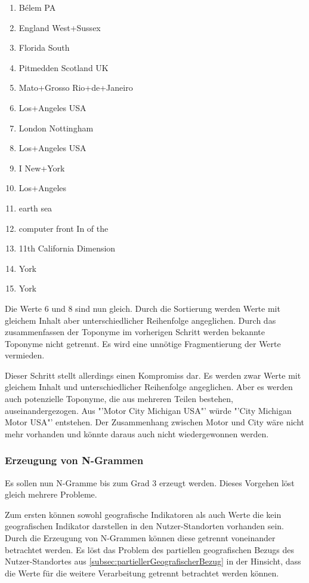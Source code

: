 				\begin{multicols}{2}
					\begin{enumerate}
						\item Bélem PA
						\item England West+Sussex
						\item Florida South
						\item Pitmedden Scotland UK
						\item Mato+Grosso Rio+de+Janeiro
						\item Los+Angeles USA
						\item London Nottingham
						\item Los+Angeles USA
						\item I New+York 
						\item Los+Angeles
						\item earth sea
						\item computer front In of the 
						\item 11th California Dimension 
						\item York
						\item York
					\end{enumerate}
				\end{multicols}

				Die Werte 6 und 8 sind nun gleich. 
				Durch die Sortierung werden Werte mit gleichem Inhalt aber unterschiedlicher Reihenfolge angeglichen.
				Durch das zusammenfassen der Toponyme im vorherigen Schritt werden bekannte Toponyme nicht getrennt.
				Es wird eine unnötige Fragmentierung der Werte vermieden.

				Dieser Schritt stellt allerdings einen Kompromiss dar.
				Es werden zwar Werte mit gleichem Inhalt und unterschiedlicher Reihenfolge angeglichen.
				Aber es werden auch potenzielle Toponyme, die aus mehreren Teilen bestehen, auseinandergezogen.
				Aus "'Motor City Michigan USA"' würde "'City Michigan Motor USA"' entstehen.
				Der Zusammenhang zwischen Motor und City wäre nicht mehr vorhanden und könnte daraus auch nicht wiedergewonnen werden.

			\subsubsection{Erzeugung von N-Grammen}

				Es sollen nun N-Gramme bis zum Grad 3 erzeugt werden. 
				Dieses Vorgehen löst gleich mehrere Probleme.

				Zum ersten können sowohl geografische Indikatoren als auch Werte die kein geografischen Indikator darstellen in den Nutzer-Standorten vorhanden sein.
				Durch die Erzeugung von N-Grammen können diese getrennt voneinander betrachtet werden.
				Es löst das Problem des partiellen geografischen Bezugs des Nutzer-Standortes aus \ref{subsec:partiellerGeografischerBezug} in der Hinsicht, dass die Werte für die weitere Verarbeitung getrennt betrachtet werden können.

